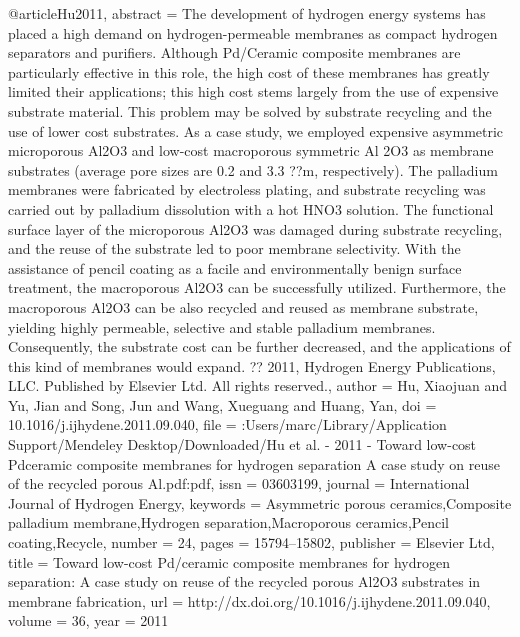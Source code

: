 @article{Hu2011,
abstract = {The development of hydrogen energy systems has placed a high demand on hydrogen-permeable membranes as compact hydrogen separators and purifiers. Although Pd/Ceramic composite membranes are particularly effective in this role, the high cost of these membranes has greatly limited their applications; this high cost stems largely from the use of expensive substrate material. This problem may be solved by substrate recycling and the use of lower cost substrates. As a case study, we employed expensive asymmetric microporous Al2O3 and low-cost macroporous symmetric Al 2O3 as membrane substrates (average pore sizes are 0.2 and 3.3 ??m, respectively). The palladium membranes were fabricated by electroless plating, and substrate recycling was carried out by palladium dissolution with a hot HNO3 solution. The functional surface layer of the microporous Al2O3 was damaged during substrate recycling, and the reuse of the substrate led to poor membrane selectivity. With the assistance of pencil coating as a facile and environmentally benign surface treatment, the macroporous Al2O3 can be successfully utilized. Furthermore, the macroporous Al2O3 can be also recycled and reused as membrane substrate, yielding highly permeable, selective and stable palladium membranes. Consequently, the substrate cost can be further decreased, and the applications of this kind of membranes would expand. ?? 2011, Hydrogen Energy Publications, LLC. Published by Elsevier Ltd. All rights reserved.},
author = {Hu, Xiaojuan and Yu, Jian and Song, Jun and Wang, Xueguang and Huang, Yan},
doi = {10.1016/j.ijhydene.2011.09.040},
file = {:Users/marc/Library/Application Support/Mendeley Desktop/Downloaded/Hu et al. - 2011 - Toward low-cost Pdceramic composite membranes for hydrogen separation A case study on reuse of the recycled porous Al.pdf:pdf},
issn = {03603199},
journal = {International Journal of Hydrogen Energy},
keywords = {Asymmetric porous ceramics,Composite palladium membrane,Hydrogen separation,Macroporous ceramics,Pencil coating,Recycle},
number = {24},
pages = {15794--15802},
publisher = {Elsevier Ltd},
title = {{Toward low-cost Pd/ceramic composite membranes for hydrogen separation: A case study on reuse of the recycled porous Al2O3 substrates in membrane fabrication}},
url = {http://dx.doi.org/10.1016/j.ijhydene.2011.09.040},
volume = {36},
year = {2011}
}
